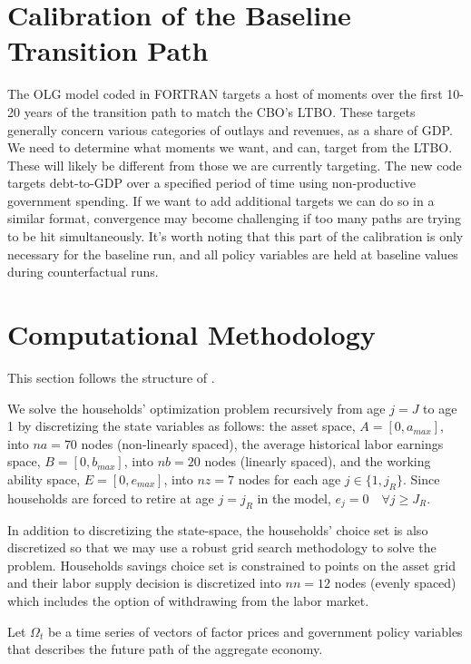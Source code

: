 \documentclass[11pt,leqno,fleqn]{article}
\begin{document}
\section{Calibration of the Baseline Transition Path}

The OLG model coded in FORTRAN targets a host of moments over the first 10-20 years of the transition path to match the CBO's LTBO. These targets generally concern various categories of outlays and revenues, as a share of GDP. We need to determine what moments we want, and can, target from the LTBO. These will likely be different from those we are currently targeting. The new code targets debt-to-GDP over a specified period of time using non-productive government spending. If we want to add additional targets we can do so in a similar format, convergence may become challenging if too many paths are trying to be hit simultaneously. It's worth noting that this part of the calibration is only necessary for the baseline run, and all policy variables are held at baseline values during counterfactual runs.


\section{Computational Methodology}

This section follows the structure of \citet{Nishiyama.Smetters:2014}.

We solve the households' optimization problem recursively from age $j=J$ to age 1 by discretizing the state variables as follows: the asset space, $A=[0,a_{max}]$, into $na = 70$ nodes (non-linearly spaced), the average historical labor earnings space, $B=[0,b_{max}]$, into $nb=20$ nodes (linearly spaced), and the working ability space, $E=[0,e_{max}]$, into $nz = 7$ nodes for each age $j\in\{1,j_R\}$. Since households are forced to retire at age $j=j_R$ in the model, $e_j=0 \quad \forall j\ge J_R$.

In addition to discretizing the state-space, the households' choice set is also discretized so that we may use a robust grid search methodology to solve the problem. Households savings choice set is constrained to points on the asset grid and their  labor supply decision is discretized into $nn = 12$ nodes (evenly spaced) which includes the option of withdrawing from the labor market.

Let $\Omega_t$ be a time series of vectors of factor prices and government policy variables that describes the future path of the aggregate economy. 
\end{document}
